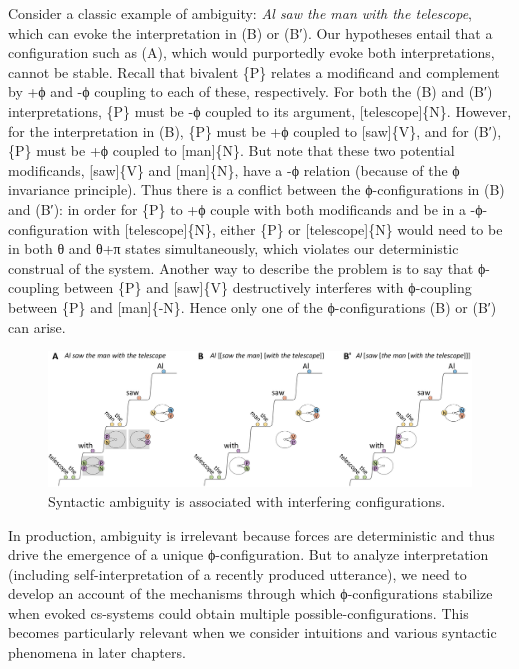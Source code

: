   Consider a classic example of ambiguity: \textit{Al saw the man with the telescope}, which can evoke the interpretation in {}(B) or (B′). Our  hypotheses entail that a configuration such as (A), which would purportedly evoke both interpretations, cannot be stable. Recall that bivalent \{P\} relates a modificand and complement by +ϕ and -ϕ coupling to each of these, respectively. For both the (B) and (B′) interpretations, \{P\} must be -ϕ coupled to its argument, [telescope]\{N\}. However, for the interpretation in (B), \{P\} must be +ϕ coupled to [saw]\{V\}, and for (B′), \{P\} must be +ϕ coupled to [man]\{N\}. But note that these two potential modificands, [saw]\{V\} and [man]\{N\}, have a -ϕ relation (because of the ϕ invariance principle). Thus there is a conflict between the ϕ-configurations in (B) and (B′): in order for \{P\} to +ϕ couple with both modificands and be in a -ϕ-configuration with [telescope]\{N\}, either \{P\} or [telescope]\{N\} would need to be in both θ and θ+π states simultaneously, which violates our deterministic construal of the system. Another way to describe the problem is to say that ϕ-coupling between \{P\} and [saw]\{V\} destructively interferes with ϕ-coupling between \{P\} and [man]\{-N\}. Hence only one of the ϕ-configurations (B) or (B′) can arise.

  
\begin{figure}
\includegraphics[width=\textwidth]{figures/Tilsen-img89.png}
\caption{Syntactic ambiguity is associated with interfering configurations.}
\label{fig:4:39}
\end{figure}
 

  In production, ambiguity is irrelevant because  forces are deterministic and thus drive the emergence of a unique ϕ-configuration. But to analyze interpretation (including self-interpretation of a recently produced utterance), we need to develop an account of the mechanisms through which ϕ-configurations stabilize when evoked cs-systems could obtain multiple possible-configurations. This becomes particularly relevant when we consider  intuitions and various syntactic phenomena in later chapters.

